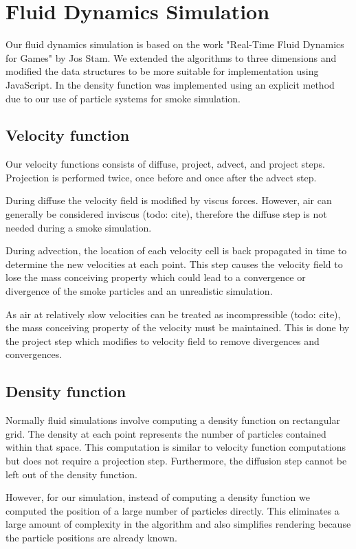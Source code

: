 \documentclass[conference]{acmsiggraph}
\begin{document}
\section{Fluid Dynamics Simulation}

Our fluid dynamics simulation is based on the work "Real-Time Fluid Dynamics for
Games" by Jos Stam. We extended the algorithms to three dimensions and modified
the data structures to be more suitable for implementation using JavaScript. In
the density function was implemented using an explicit method due to our use of
particle systems for smoke simulation.

\subsection{Velocity function}

Our velocity functions consists of diffuse, project, advect, and project steps.
Projection is performed twice, once before and once after the advect step. 

During diffuse the velocity field is modified by viscus forces. However, air can
generally be considered inviscus (todo: cite), therefore the diffuse step is not
needed during a smoke simulation.

During advection, the location of each velocity cell is back propagated in time
to determine the new velocities at each point. This step causes the velocity
field to lose the mass conceiving property which could lead to a convergence or
divergence of the smoke particles and an unrealistic simulation.

As air at relatively slow velocities can be treated as incompressible (todo:
cite), the mass conceiving property of the velocity must be maintained. This is
done by the project step which modifies to velocity field to remove divergences
and convergences.

\subsection{Density function}

Normally fluid simulations involve computing a density function on rectangular
grid. The density at each point represents the number of particles contained
within that space. This computation is similar to velocity function computations
but does not require a projection step. Furthermore, the diffusion step cannot
be left out of the density function.

However, for our simulation, instead of computing a density function we computed
the position of a large number of particles directly. This eliminates a large
amount of complexity in the algorithm and also simplifies rendering because the
particle positions are already known.
\end{document}
